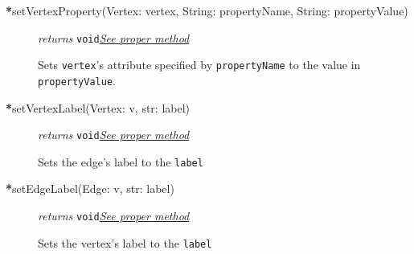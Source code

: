 \begin{description}
\item[\textbf{*}setVertexProperty(Vertex: vertex, String: propertyName, String: propertyValue)] \emph{returns} \texttt{void}\quad \hyperref[setVertexPropertyClass]{\textit{See proper method}}


Sets \texttt{vertex}'s attribute specified by \texttt{propertyName} to the value in \texttt{propertyValue}.

\item[\textbf{*}setVertexLabel(Vertex: v, str: label)] \emph{returns} \texttt{void}\quad \hyperref[setVertexLabelClass]{\textit{See proper method}}

Sets the edge's label to the \texttt{label}

\item[\textbf{*}setEdgeLabel(Edge: v, str: label)] \emph{returns} \texttt{void}\quad \hyperref[setEdgeLabelClass]{\textit{See proper method}}

Sets the vertex's label to the \texttt{label}
  
\end{description}

